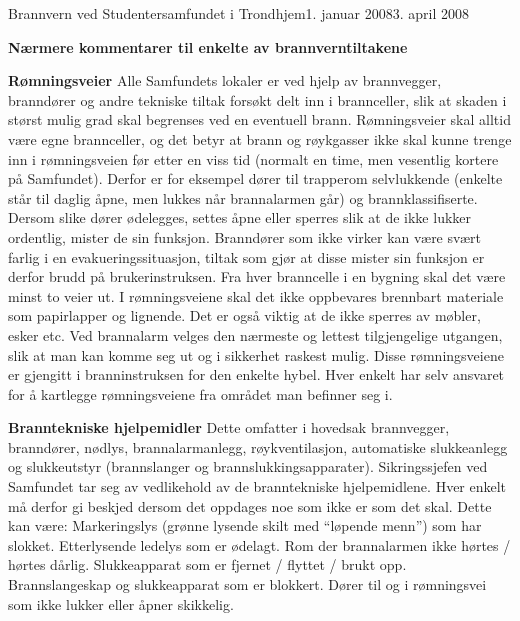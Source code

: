 \begin{instruks}{Brannvern ved Studentersamfundet i Trondhjem}{1. januar 2008}{3. april 2008}
    \begin{center}\textbf{Nærmere kommentarer til enkelte av brannverntiltakene} \end{center}
    \begin{description}
        \item \textbf{Rømningsveier} Alle Samfundets lokaler er ved hjelp av brannvegger, branndører og andre tekniske tiltak
                forsøkt delt inn i brannceller, slik at skaden i størst mulig grad skal begrenses ved en eventuell brann.
                Rømningsveier skal alltid være egne brannceller, og det betyr at brann og røykgasser ikke skal kunne trenge inn i
                rømningsveien før etter en viss tid (normalt en time, men vesentlig kortere på Samfundet). Derfor er for eksempel dører til
                trapperom selvlukkende (enkelte står til daglig åpne, men lukkes når brannalarmen går) og brannklassifiserte.
                Dersom slike dører ødelegges, settes åpne eller sperres slik at de ikke lukker ordentlig, mister de sin funksjon.
                Branndører som ikke virker kan være svært farlig i en evakueringssituasjon, tiltak som gjør at disse mister sin funksjon er
                derfor brudd på brukerinstruksen. Fra hver branncelle i en bygning skal det være minst to veier ut. I rømningsveiene skal
                det ikke oppbevares brennbart materiale som papirlapper og lignende. Det er også viktig at de ikke sperres av møbler,
                esker etc. Ved brannalarm velges den nærmeste og lettest tilgjengelige utgangen, slik at man kan
                komme seg ut og i sikkerhet raskest mulig. Disse rømningsveiene er gjengitt i branninstruksen for den enkelte hybel.
                Hver enkelt har selv ansvaret for å kartlegge rømningsveiene fra området man befinner seg i.

            \item \textbf{Branntekniske hjelpemidler} Dette omfatter i hovedsak brannvegger, branndører, nødlys, brannalarmanlegg, røykventilasjon,
                automatiske slukkeanlegg og slukkeutstyr (brannslanger og brannslukkingsapparater).
                Sikringssjefen ved Samfundet tar seg av vedlikehold av de branntekniske hjelpemidlene. Hver enkelt må derfor gi beskjed
                dersom det oppdages noe som ikke er som det skal. Dette kan være: Markeringslys (grønne lysende skilt med ``løpende menn'') som har slokket.
                Etterlysende ledelys som er ødelagt. Rom der brannalarmen ikke hørtes / hørtes dårlig. Slukkeapparat som er fjernet / flyttet / brukt opp.
                Brannslangeskap og slukkeapparat som er blokkert. Dører til og i rømningsvei som ikke lukker eller åpner skikkelig.
        \end{description}

   
\end{instruks}


